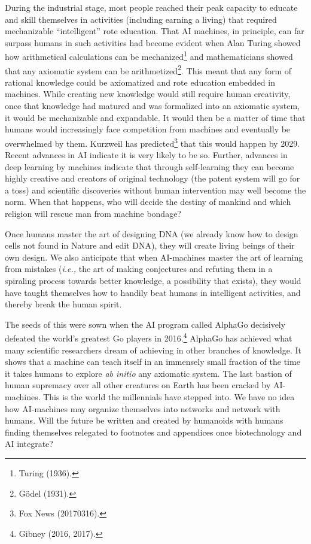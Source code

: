 \begin{multicols}{2}
During the industrial stage, most people reached their peak capacity to educate and skill themselves in activities (including earning a living) that required mechanizable “intelligent” rote education. That AI machines, in principle, can far surpass humans in such activities had become evident when Alan Turing showed how arithmetical calculations can be mechanized\footnote{Turing (1936).}  and mathematicians showed that any axiomatic system can be arithmetized\footnote{Gödel (1931).}. This meant that any form of rational knowledge could be axiomatized and rote education embedded in machines. While creating new knowledge would still require human creativity, once that knowledge had matured and was formalized into an axiomatic system, it would be mechanizable and expandable. It would then be a matter of time that humans would increasingly face competition from machines and eventually be overwhelmed by them. Kurzweil has predicted\footnote{Fox News (20170316).}  that this would happen by 2029. Recent advances in AI indicate it is very likely to be so. Further, advances in deep learning by machines indicate that through self-learning they can become highly creative and creators of original technology (the patent system will go for a toss) and scientific discoveries without human intervention may well become the norm. When that happens, who will decide the destiny of mankind and which religion will rescue man from machine bondage?

Once humans master the art of designing DNA (we already know how to design cells not found in Nature and edit DNA), they will create living beings of their own design. We also anticipate that when AI-machines master the art of learning from mistakes (\textit{i.e.,} the art of making conjectures and refuting them in a spiraling process towards better knowledge, a possibility that exists), they would have taught themselves how to handily beat humans in intelligent activities, and thereby break the human spirit.

The seeds of this were sown when the AI program called AlphaGo decisively defeated the world's greatest Go players in 2016.\footnote{Gibney (2016, 2017).} AlphaGo has achieved what many scientific researchers dream of achieving in other branches of knowledge. It shows that a machine can teach itself in an immensely small fraction of the time it takes humans to explore \textit{ab initio} any axiomatic system. The last bastion of human supremacy over all other creatures on Earth has been cracked by AI-machines. This is the world the millennials have stepped into. We have no idea how AI-machines may organize themselves into networks and network with humans. Will the future be written and created by humanoids with humans finding themselves relegated to footnotes and appendices once biotechnology and AI integrate? 


\end{multicols}
